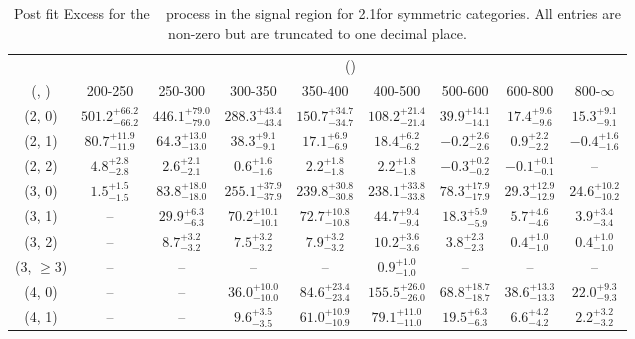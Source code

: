 \begin{table}[h!]
\tiny
\centering
\caption{Post fit Excess for the \zInv~ process in the signal region for 2.1\ifb for symmetric categories. All entries are non-zero but are truncated to one decimal place.\label{tab:excessseppost_sig_zinv_sym}}
\begin{tabular}
{ccccccccc}
	\hline\hline
	& \multicolumn{8}{c}{\scalht (\gev)} \\ 
	 (\njet,  \nb) & 200-250 & 250-300 & 300-350 & 350-400 & 400-500 & 500-600 & 600-800 & 800-$\infty$ \\ [0.8ex] 
\hline
	(2, 0) & $501.2^{+ 66.2 }_{- 66.2 }$ & $446.1^{+ 79.0 }_{- 79.0 }$ & $288.3^{+ 43.4 }_{- 43.4 }$ & $150.7^{+ 34.7 }_{- 34.7 }$ & $108.2^{+ 21.4 }_{- 21.4 }$ & $39.9^{+ 14.1 }_{- 14.1 }$ & $17.4^{+ 9.6 }_{- 9.6 }$ & $15.3^{+ 9.1 }_{- 9.1 }$ \\[0.5ex] 
	(2, 1) & $80.7^{+ 11.9 }_{- 11.9 }$ & $64.3^{+ 13.0 }_{- 13.0 }$ & $38.3^{+ 9.1 }_{- 9.1 }$ & $17.1^{+ 6.9 }_{- 6.9 }$ & $18.4^{+ 6.2 }_{- 6.2 }$ & $-0.2^{+ 2.6 }_{- 2.6 }$ & $0.9^{+ 2.2 }_{- 2.2 }$ & $-0.4^{+ 1.6 }_{- 1.6 }$ \\[0.5ex] 
	(2, 2) & $4.8^{+ 2.8 }_{- 2.8 }$ & $2.6^{+ 2.1 }_{- 2.1 }$ & $0.6^{+ 1.6 }_{- 1.6 }$ & $2.2^{+ 1.8 }_{- 1.8 }$ & $2.2^{+ 1.8 }_{- 1.8 }$ & $-0.3^{+ 0.2 }_{- 0.2 }$ & $-0.1^{+ 0.1 }_{- 0.1 }$ & -- \\[0.5ex] 
	(3, 0) & $1.5^{+ 1.5 }_{- 1.5 }$ & $83.8^{+ 18.0 }_{- 18.0 }$ & $255.1^{+ 37.9 }_{- 37.9 }$ & $239.8^{+ 30.8 }_{- 30.8 }$ & $238.1^{+ 33.8 }_{- 33.8 }$ & $78.3^{+ 17.9 }_{- 17.9 }$ & $29.3^{+ 12.9 }_{- 12.9 }$ & $24.6^{+ 10.2 }_{- 10.2 }$ \\[0.5ex] 
	(3, 1) & -- & $29.9^{+ 6.3 }_{- 6.3 }$ & $70.2^{+ 10.1 }_{- 10.1 }$ & $72.7^{+ 10.8 }_{- 10.8 }$ & $44.7^{+ 9.4 }_{- 9.4 }$ & $18.3^{+ 5.9 }_{- 5.9 }$ & $5.7^{+ 4.6 }_{- 4.6 }$ & $3.9^{+ 3.4 }_{- 3.4 }$ \\[0.5ex] 
	(3, 2) & -- & $8.7^{+ 3.2 }_{- 3.2 }$ & $7.5^{+ 3.2 }_{- 3.2 }$ & $7.9^{+ 3.2 }_{- 3.2 }$ & $10.2^{+ 3.6 }_{- 3.6 }$ & $3.8^{+ 2.3 }_{- 2.3 }$ & $0.4^{+ 1.0 }_{- 1.0 }$ & $0.4^{+ 1.0 }_{- 1.0 }$ \\[0.5ex] 
	(3, $\ge3$) & -- & -- & -- & -- & $0.9^{+ 1.0 }_{- 1.0 }$ & -- & -- & -- \\[0.5ex] 
	(4, 0) & -- & -- & $36.0^{+ 10.0 }_{- 10.0 }$ & $84.6^{+ 23.4 }_{- 23.4 }$ & $155.5^{+ 26.0 }_{- 26.0 }$ & $68.8^{+ 18.7 }_{- 18.7 }$ & $38.6^{+ 13.3 }_{- 13.3 }$ & $22.0^{+ 9.3 }_{- 9.3 }$ \\[0.5ex] 
	(4, 1) & -- & -- & $9.6^{+ 3.5 }_{- 3.5 }$ & $61.0^{+ 10.9 }_{- 10.9 }$ & $79.1^{+ 11.0 }_{- 11.0 }$ & $19.5^{+ 6.3 }_{- 6.3 }$ & $6.6^{+ 4.2 }_{- 4.2 }$ & $2.2^{+ 3.2 }_{- 3.2 }$ \\[0.5ex] 

\end{tabular}
\end{table}
